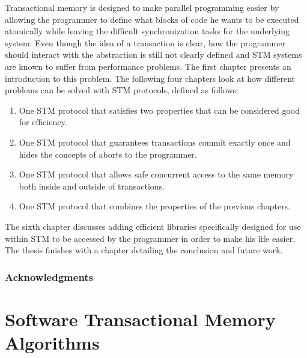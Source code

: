 \documentclass[11pt]{book}
\begin{document}
Transactional memory is designed to make parallel programming easier by allowing the programmer to define
what blocks of code he wants to be executed atomically while leaving the difficult synchronization tasks for the
underlying system.
Even though the idea of a transaction is clear, how the programmer should interact with the
abstraction is still not clearly defined and STM systems are known to suffer from performance problems.
The first chapter presents an introduction to this problem.
The following four chapters look at how different problems can be solved with STM protocols,
defined as follows:
\begin{enumerate}
\item One STM protocol that satisfies two properties that can be considered good for efficiency.
\item One STM protocol that guarantees transactions commit exactly once and hides the concepts of aborts to the programmer.
\item One STM protocol that allows safe concurrent access to the same memory both inside and outside of transactions.
\item One STM protocol that combines the properties of the previous chapters.
\end{enumerate}
The sixth chapter discusses adding efficient libraries specifically designed for use within STM
to be accessed by the programmer in order to make his life easier.
The thesis finishes with a chapter detailing the conclusion and future work.



\newpage

\section*{Acknowledgments}
%

\sloppy

\tableofcontents      	%
\listoffigures        	%
\clearpage




\part{Software Transactional Memory Algorithms}
\end{document}
